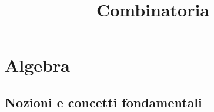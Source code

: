 



\title{Combinatoria}

\maketitle

\newpage

\tableofcontents
\newpage

\part{Algebra}

\chapter{Nozioni e concetti fondamentali}



\listoftables

\listoffigures



